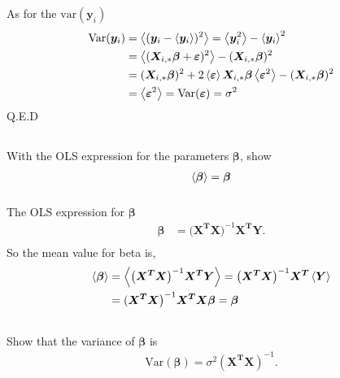 \documentclass[10pt]{revtex4-2}
\begin{document}
As for the $\mbox{var}(\bm{y}_i)$
\begin{align}
	\mbox{Var}(\bm{y}_i) &=  \expval{ (\bm{y}_i - \expval{\bm{y}_i})^2 } 
		= \expval{\bm{y}_i^2} - \expval{\bm{y}_i}^2 \\
	&= \expval{( \bm{X}_{i,*}\bm{\beta} + \bm{\varepsilon} )^2} - (\bm{X}_{i,*}\bm{\beta})^2\\
	&= (\bm{X}_{i,*}\bm{\beta})^2 + 2\expval{\bm{\varepsilon}}\bm{X}_{i,*}\bm{\beta}
		\expval{\bm{\varepsilon}^2} - (\bm{X}_{i,*}\bm{\beta})^2 \\
	&= \expval{\bm{\varepsilon}^2} = \mbox{Var}(\bm{\varepsilon}) = \sigma^2
\end{align}
Q.E.D

\subsection{}
With the OLS expression for the parameters $\bm{\beta}$, show
\begin{align}
	\expval{\bm{\beta}} = \bm{\beta}
\end{align}
\subsubsection{}
The OLS expression for $\bm{\beta}$
\begin{align}
	\bm{\beta} &= \big( \bm{X^T}\bm{X} \big)^{-1} \bm{X^T} \bm{Y}. \\
\end{align}
So the mean value for beta is,
\begin{align}
	\expval{\bm{\beta}} &= \expval{ \big( \bm{X^T}\bm{X} \big)^{-1} \bm{X^T} \bm{Y} }
		=  \big( \bm{X^T}\bm{X} \big)^{-1} \bm{X^T} \expval{\bm{Y}} \\
	&=  (\bm{X^T}\bm{X} \big)^{-1} \bm{X^T} \bm{X}\bm{\beta} = \bm{\beta}
\end{align}

\subsection{}
Show that the variance of $\bm{\beta}$ is 
\begin{align}
	\mbox{Var}(\bm{\beta}) = \sigma^2(\bm{X^T}\bm{X})^{-1}.
\end{align}
\end{document}
